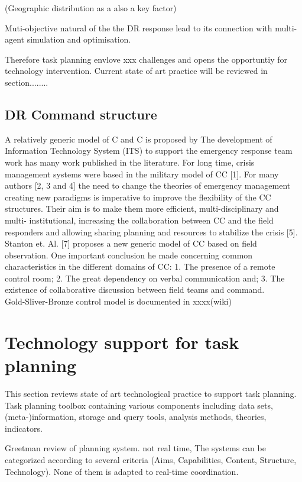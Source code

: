 (Geographic distribution as a also a key factor)

\noindent Muti-objective natural of the the DR response lead to its connection with multi-agent simulation and optimisation. 

Therefore task planning envlove xxx challenges and opens the opportuntiy for technology intervention. Current state of art practice will be reviewed in section........\\

\subsection{DR Command structure}


A relatively generic model of C and C is proposed by 
The development of Information Technology System (ITS)
to support the emergency response team work has many work published in the literature. For long time, crisis management systems were based in the military model of CC [1]. For many authors [2, 3 and 4] the need to change the theories of emergency management creating new paradigms is imperative to improve the flexibility of the CC structures. Their aim is to make them more
efficient, multi-disciplinary and multi-
institutional, increasing the collaboration between CC and the field responders and allowing sharing planning and resources to stabilize the crisis [5].
Stanton et. Al. [7] proposes a new generic model of CC
based on field observation. One important conclusion he made concerning common characteristics in the different domains of CC:
1. The presence of a remote control room; 2. The great dependency on verbal communication and;
3. The existence of collaborative discussion between field teams and command.\\


Gold-Sliver-Bronze control model is documented in xxxx(wiki)

\section{Technology support for task planning}
This section reviews state of art technological practice to support task planning. Task planning toolbox containing various components including data sets, (meta-)information, storage and query tools, analysis methods, theories, indicators.

Greetman review of planning system. not real time, The systems can be categorized according to several criteria (Aims, Capabilities, Content, Structure, Technology). None of them is adapted to real-time coordination.

